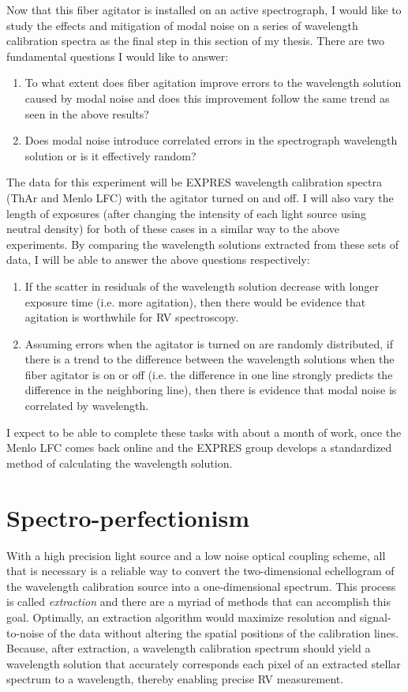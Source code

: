 \documentclass[11pt]{article}
\begin{document}
Now that this fiber agitator is installed on an active spectrograph, I would like to study the effects and mitigation of modal noise on a series of wavelength calibration spectra as the final step in this section of my thesis. There are two fundamental questions I would like to answer:
\begin{enumerate}
    \item To what extent does fiber agitation improve errors to the wavelength solution caused by modal noise and does this improvement follow the same trend as seen in the above results?
    \item Does modal noise introduce correlated errors in the spectrograph wavelength solution or is it effectively random?
\end{enumerate}
The data for this experiment will be EXPRES wavelength calibration spectra (ThAr and Menlo LFC) with the agitator turned on and off. I will also vary the length of exposures (after changing the intensity of each light source using neutral density) for both of these cases in a similar way to the above experiments. By comparing the wavelength solutions extracted from these sets of data, I will be able to answer the above questions respectively:
\begin{enumerate}
    \item If the scatter in residuals of the wavelength solution decrease with longer exposure time (i.e. more agitation), then there would be evidence that agitation is worthwhile for RV spectroscopy.
    \item Assuming errors when the agitator is turned on are randomly distributed, if there is a trend to the difference between the wavelength solutions when the fiber agitator is on or off (i.e. the difference in one line strongly predicts the difference in the neighboring line), then there is evidence that modal noise is correlated by wavelength.
\end{enumerate}
I expect to be able to complete these tasks with about a month of work, once the Menlo LFC comes back online and the EXPRES group develops a standardized method of calculating the wavelength solution.

\section{Spectro-perfectionism}
\label{sec:spec_perf}

With a high precision light source and a low noise optical coupling scheme, all that is necessary is a reliable way to convert the two-dimensional echellogram of the wavelength calibration source into a one-dimensional spectrum. This process is called \textit{extraction} and there are a myriad of methods that can accomplish this goal. Optimally, an extraction algorithm would maximize resolution and signal-to-noise of the data without altering the spatial positions of the calibration lines. Because, after extraction, a wavelength calibration spectrum should yield a wavelength solution that accurately corresponds each pixel of an extracted stellar spectrum to a wavelength, thereby enabling precise RV measurement.
\end{document}

